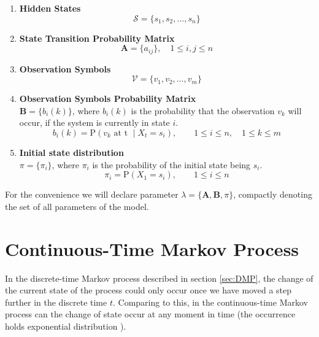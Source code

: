 \documentclass[thesis=M,english]{FITthesis}[2012/10/20]
\newcommand{\matr}[1]{\mathbf{#1}}
\begin{document}
\begin{enumerate}[resume]
\setcounter{enumi}{0}
\item \textbf{Hidden States}
\begin{equation}
\mathcal{S} = \{ s_1,s_2, \dots, s_n \}
\end{equation} 
\item \textbf{State Transition Probability Matrix}
\begin{equation}\label{eq:tp}
\matr{A} = \{ a_{ij} \}, \quad 1 \leq i,j \leq n
\end{equation} 
\item \textbf{Observation Symbols}
\begin{equation}
\mathcal{V} = \{ v_1,v_2, \dots, v_m \} 
\end{equation}
\item \textbf{Observation Symbols Probability Matrix} \\
$\matr{B} = \{ b_{i}(k) \}$, where $b_{i}(k)$ is the probability that the observation $v_k$ will occur, if the system is currently in state $i$. 
\begin{equation}
b_i(k) = \mathrm{P}(v_k \text{ at t } \mid X_t = s_i), \qquad 1 \leq i \leq n, \quad 1 \leq k \leq m
\end{equation}
\item \textbf{Initial state distribution} \\
$\pi = \{ \pi_i \}$, where $\pi_i$ is the probability of the initial state being $s_i$.
\begin{equation}
\pi_{i} = \mathrm{P}(X_1 = s_i), \qquad 1 \leq i \leq n
\end{equation}
\end{enumerate}

For the convenience we will declare parameter $\lambda = \{\matr{A},\matr{B},\pi\}$, compactly denoting the set of all parameters of the model. 

\section{Continuous-Time Markov Process}\label{sec:ctmp}

In the discrete-time Markov process described in section \ref{sec:DMP}, the change of the current state of the process could only occur once we have moved a step further in the discrete time $t$. Comparing to this, in the continuous-time Markov process can the change of state occur at any moment in time (the occurrence holds exponential distribution ).
\end{document}
